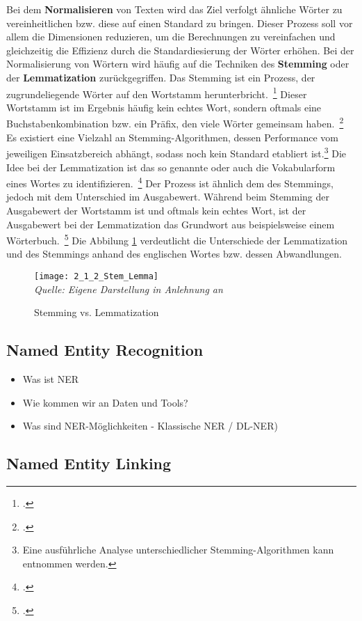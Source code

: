 Bei dem \textbf{Normalisieren} von Texten wird das Ziel verfolgt ähnliche Wörter zu vereinheitlichen bzw.
diese auf einen Standard zu bringen.
Dieser Prozess soll vor allem die Dimensionen reduzieren, um die Berechnungen zu vereinfachen und gleichzeitig die
Effizienz durch die Standardiesierung der Wörter erhöhen.
\newline
Bei der Normalisierung von Wörtern wird häufig auf die Techniken des \textbf{Stemming} oder der \textbf{Lemmatization}
zurückgegriffen.
Das Stemming ist ein Prozess, der zugrundeliegende Wörter auf den Wortstamm herunterbricht.~\footcite[\vglf][]
{khyani.2021}
Dieser Wortstamm ist im Ergebnis häufig kein echtes Wort, sondern oftmals eine Buchstabenkombination bzw.
ein Präfix, den viele Wörter gemeinsam haben.~\footcite[\vglf][]{khyani.2021}
Es existiert eine Vielzahl an Stemming-Algorithmen, dessen Performance vom jeweiligen Einsatzbereich abhängt, sodass
noch kein Standard etabliert ist.\footnote{Eine ausführliche Analyse unterschiedlicher Stemming-Algorithmen kann
\cite{jivani.2011} entnommen werden.}
\newline
Die Idee bei der Lemmatization ist das so genannte \grqq{} oder auch die Vokabularform eines Wortes
zu identifizieren.~\footcite[\vglf][]{khyani.2021}
Der Prozess ist ähnlich dem des Stemmings, jedoch mit dem Unterschied im Ausgabewert.
Während beim Stemming der Ausgabewert der Wortstamm ist und oftmals kein echtes Wort,
ist der Ausgabewert bei der Lemmatization das Grundwort aus beispielsweise einem Wörterbuch.~\footcite[\vglf]
[]{khyani.2021}
Die Abbilung  \ref{fig:2_1_2_Stem_Lemma} verdeutlicht die Unterschiede der Lemmatization und des Stemmings anhand
des englischen Wortes \grqq{} bzw. dessen Abwandlungen.

\begin{figure}[H]
    \caption{Stemming vs. Lemmatization}\label{fig:2_1_2_Stem_Lemma}
    \texttt{[image: 2\_1\_2\_Stem\_Lemma]}
    \\
    \textit{Quelle: Eigene Darstellung in Anlehnung an}~\cite[]{khyani.2021}
\end{figure}


\subsection{Named Entity Recognition}

\begin{itemize}
    \item Was ist NER
    \item Wie kommen wir an Daten und Tools?
    \item Was sind NER-Möglichkeiten - Klassische NER / DL-NER)
\end{itemize}

\subsection{Named Entity Linking}